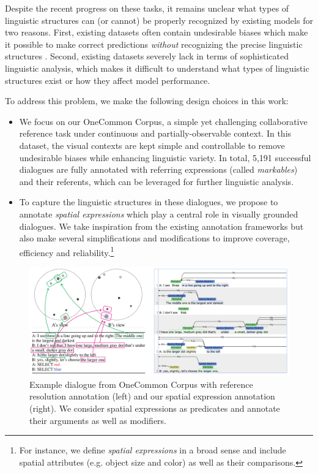 Despite the recent progress on these tasks, it remains unclear what types of linguistic structures can (or cannot) be properly recognized by existing models for two reasons. First, existing datasets often contain undesirable biases which make it possible to make correct predictions \textit{without} recognizing the precise linguistic structures \citep{goyal2017making,cirik-etal-2018-visual,agarwal-etal-2020-history}. Second, existing datasets severely lack in terms of sophisticated linguistic analysis, which makes it difficult to understand what types of linguistic structures exist or how they affect model performance.

To address this problem, we make the following design choices in this work:

\begin{itemize}%
\item We focus on our OneCommon Corpus, a simple yet challenging collaborative reference task under continuous and partially-observable context. In this dataset, the visual contexts are kept simple and controllable to remove undesirable biases while enhancing linguistic variety. In total, 5,191 successful dialogues are fully annotated with referring expressions (called \textit{markables}) and their referents, which can be leveraged for further linguistic analysis.

\item To capture the linguistic structures in these dialogues, we propose to annotate \textit{spatial expressions} which play a central role in visually grounded dialogues. We take inspiration from the existing annotation frameworks \citep{pustejovsky2011iso,pustejovsky2011using,petruck-ellsworth-2018-representing,ulinski-etal-2019-spatialnet} but also make several simplifications and modifications to improve coverage, efficiency and reliability.\footnote{For instance, we define \textit{spatial expressions} in a broad sense and include spatial attributes (e.g. object size and color) as well as their comparisons.}
\end{itemize}

\begin{figure}[t!]
\centering
\includegraphics[width=\textwidth]{spatial_expression.pdf}
\caption{Example dialogue from OneCommon Corpus with reference resolution annotation (left) and our spatial expression annotation (right). We consider spatial expressions as predicates and annotate their arguments as well as modifiers.%
}
\label{05_fig:first_example}
\end{figure}

